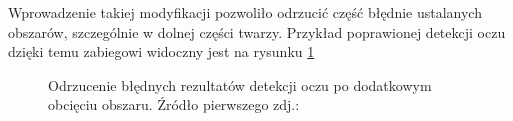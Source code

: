 Wprowadzenie takiej modyfikacji pozwoliło odrzucić część błędnie ustalanych obszarów, szczególnie w dolnej części twarzy. Przykład poprawionej detekcji oczu dzięki temu zabiegowi widoczny jest na rysunku \ref{fig:eye_detect_crop}

\begin{figure}[!h]
    \begin{center}
        \hspace{8mm}
    \end{center}
    \caption{Odrzucenie błędnych rezultatów detekcji oczu po dodatkowym obcięciu obszaru. Źródło pierwszego zdj.:\cite{readheadPortrait2}}
    \label{fig:eye_detect_crop}
\end{figure}


